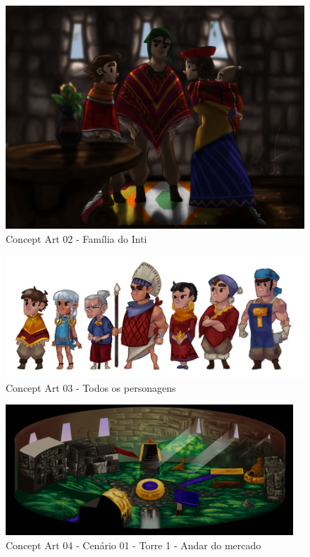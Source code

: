 \documentclass[12pt]{article}
\begin{document}
\begin{figure}[hp]
    \centering
    \includegraphics[scale=0.3]{concept_art_02.jpg}
    \caption{Concept Art 02 - Família do Inti}
    \label{fig:concept_art_02}
\end{figure}

\begin{figure}[hp]
    \centering
    \includegraphics[scale=0.4]{concept_art_03.jpg}
    \caption{Concept Art 03 - Todos os personagens}
    \label{fig:concept_art_03}
\end{figure}

\begin{figure}[hp]
    \centering
    \includegraphics[scale=0.4]{concept_art_04.png}
    \caption{Concept Art 04 - Cenário 01 - Torre 1 - Andar do mercado}
    \label{fig:concept_art_04}
\end{figure}
\end{document}
